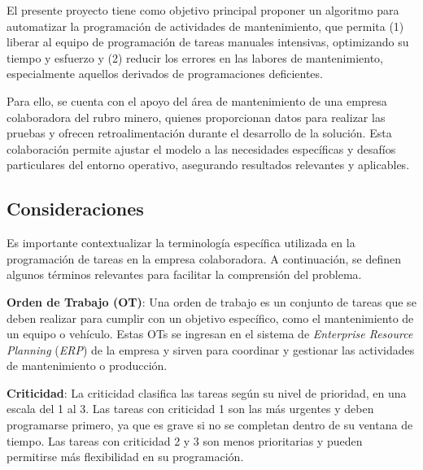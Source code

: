 \documentclass{article}
\begin{document}
El presente proyecto tiene como objetivo principal proponer un algoritmo para automatizar la programación de actividades de mantenimiento, que permita (1) liberar al equipo de programación de tareas manuales intensivas, optimizando su tiempo y esfuerzo y (2) reducir los errores en las labores de mantenimiento, especialmente aquellos derivados de programaciones deficientes. 

Para ello, se cuenta con el apoyo del área de mantenimiento de una empresa colaboradora del rubro minero, quienes proporcionan datos para realizar las pruebas y ofrecen retroalimentación durante el desarrollo de la solución. Esta colaboración permite ajustar el modelo a las necesidades específicas y desafíos particulares del entorno operativo, asegurando resultados relevantes y aplicables.


\subsection{Consideraciones}
Es importante contextualizar la terminología específica utilizada en la programación de tareas en la empresa colaboradora. A continuación, se definen algunos términos relevantes para facilitar la comprensión del problema.


\textbf{Orden de Trabajo (OT)}: Una orden de trabajo es un conjunto de tareas que se deben realizar para cumplir con un objetivo específico, como el mantenimiento de un equipo o vehículo. Estas OTs se ingresan en el sistema de \textit{Enterprise Resource Planning} (\textit{ERP}) de la empresa y sirven para coordinar y gestionar las actividades de mantenimiento o producción.


\textbf{Criticidad}: La criticidad clasifica las tareas según su nivel de prioridad, en una escala del 1 al 3. Las tareas con criticidad 1 son las más urgentes y deben programarse primero, ya que es grave si no se completan dentro de su ventana de tiempo. Las tareas con criticidad 2 y 3 son menos prioritarias y pueden permitirse más flexibilidad en su programación.
\end{document}
